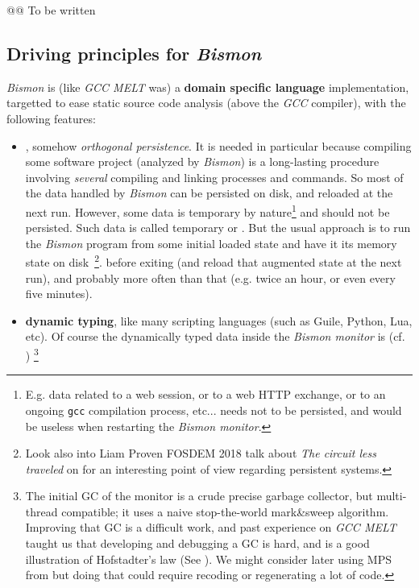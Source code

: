 @@ To be written

\medskip

\subsection{Driving principles for  \textit{Bismon}}

\textit{Bismon} is (like \textit{GCC MELT} was) a \textbf{domain
  specific language} implementation, targetted to ease static source
code analysis (above the \textit{GCC} compiler), with the following
features:

\begin{itemize}

  \item {}, somehow
    \textit{orthogonal persistence}. It is needed in particular
    because compiling some software project (analyzed by
    \textit{Bismon}) is a long-lasting procedure involving
    \textit{several} compiling and linking processes and commands. So
    most of the data handled by \textit{Bismon} can be persisted on
    disk, and reloaded at the next run. However, some data is
    temporary by nature\footnote{E.g. data related to a web session,
      or to a web HTTP exchange, or to an ongoing \texttt{gcc}
      compilation process, etc... needs not to be persisted, and would
      be useless when restarting the \textit{Bismon monitor}.} and
    should not be persisted. Such data is called temporary or
    . But the usual approach is
    to run the \textit{Bismon} program from some initial loaded state
    and have it  its memory state on
    disk~\footnote{Look also into Liam Proven FOSDEM 2018 talk about
      \emph{The circuit less traveled} on
      for an interesting point of view regarding persistent systems.}.
    before exiting (and reload that augmented state at the next run),
    and probably more often than that (e.g. twice an hour, or even
    every five minutes).

  \item \textbf{dynamic typing}, like many scripting languages (such
    as Guile, Python, Lua, etc). Of course the dynamically typed data
    inside the \textit{Bismon monitor} is 
    (cf. \cite{Jones:2011:GC-handbook})
    \footnote{\label{fn:initial-gc}The initial GC of the monitor is a crude precise garbage
      collector, but multi-thread compatible; it uses a naive
      stop-the-world mark\&sweep algorithm. Improving that GC is a
      difficult work, and past experience on \emph{GCC MELT} taught us
      that developing and debugging a GC is hard, and is a good
      illustration of Hofstadter's law (See
      \cite{Hofstadter:1979:GEB}). We might consider later using MPS
      from  but doing
      that could require recoding or regenerating a lot of code.}


\end{itemize}
